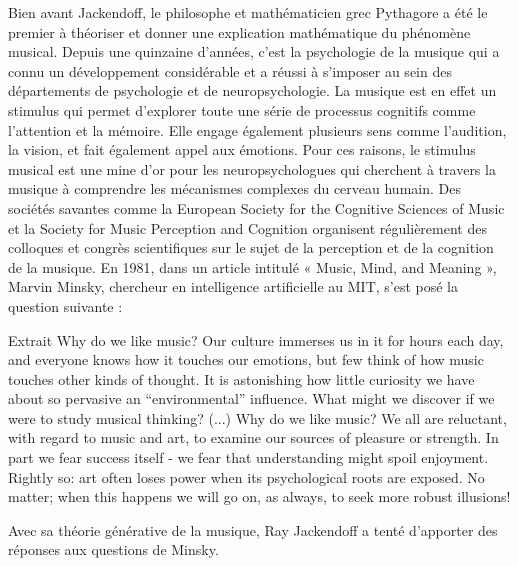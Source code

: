 
Bien avant Jackendoff, le philosophe et mathématicien grec Pythagore a été le premier à théoriser et donner une explication mathématique du phénomène musical. Depuis une quinzaine d’années, c’est la psychologie de la musique qui a connu un développement considérable et a réussi à s'imposer au sein des départements de psychologie et de neuropsychologie. La musique est en effet un stimulus qui permet d’explorer toute une série de processus cognitifs comme l'attention et la mémoire. Elle engage également plusieurs sens comme l’audition, la vision, et fait également appel aux émotions. Pour ces raisons, le stimulus musical est une mine d’or pour les neuropsychologues qui cherchent à travers la musique à comprendre les mécanismes complexes du cerveau humain. Des sociétés savantes comme la European Society for the Cognitive Sciences of Music et la Society for Music Perception and Cognition organisent régulièrement des colloques et congrès scientifiques sur le sujet de la perception et de la cognition de la musique. En 1981, dans un article intitulé « Music, Mind, and Meaning », Marvin Minsky, chercheur en intelligence artificielle au MIT, s’est posé la question suivante : 
\begin{lecture}{Extrait}
Why do we like music? Our culture immerses us in it for hours each day, and everyone knows how it touches our emotions, but few think of how music touches other kinds of thought. It is astonishing how little curiosity we have about so pervasive an “environmental” influence. What might we discover if we were to study musical thinking? (...) Why do we like music? We all are reluctant, with regard to music and art, to examine our sources of pleasure or strength. In part we fear success itself - we fear that understanding might spoil enjoyment. Rightly so: art often loses power when its psychological roots are exposed. No matter; when this happens we will go on, as always, to seek more robust illusions!
\end{lecture}
 Avec sa théorie générative de la musique, Ray Jackendoff a tenté d'apporter des réponses aux questions de Minsky.\par



